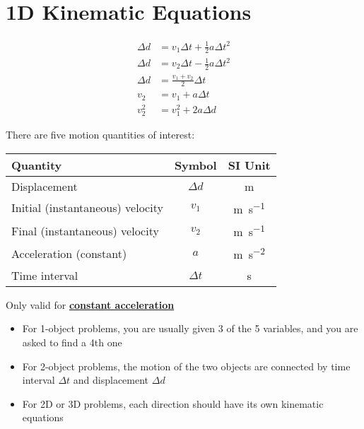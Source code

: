 \section{1D Kinematic Equations}

\begin{align*}
  \Delta d &=v_1\Delta t + \frac12a\Delta t^2\\
  \Delta d &=v_2\Delta t - \frac12a\Delta t^2\\
  \Delta d &=\frac{v_1+v_2}2 \Delta t\\
  v_2 &= v_1+ a \Delta t\\
  v_2^2 &= v_1^2+ 2a \Delta d
\end{align*}

There are five motion quantities of interest:
\begin{center}
  \begin{tabular}{l|c|c}
    \rowcolor{pink}
    \textbf{Quantity} & \textbf{Symbol} & \textbf{SI Unit} \\ \hline
    Displacement & $\Delta d$ & \si{\metre} \\
    Initial (instantaneous) velocity & $v_1$ & \si{\metre\per\second} \\
    Final (instantaneous) velocity   & $v_2$ & \si{\metre\per\second} \\
    Acceleration (constant) & $a$    & \si{\metre\per\second\squared}\\
    Time interval & $\Delta t$ & \si\second
  \end{tabular}
\end{center}
Only valid for \underline{\textbf{constant acceleration}}



\begin{itemize}
\item For 1-object problems, you are usually given 3 of the 5 variables,
  and you are asked to find a 4th one
\item For 2-object problems, the motion of the two objects are connected by
  time interval $\Delta t$ and displacement $\Delta d$
\item For 2D or 3D problems, each direction should have its own kinematic
  equations
\end{itemize}



